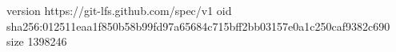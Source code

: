 version https://git-lfs.github.com/spec/v1
oid sha256:012511eaa1f850b58b99fd97a65684c715bff2bb03157e0a1c250caf9382c690
size 1398246
